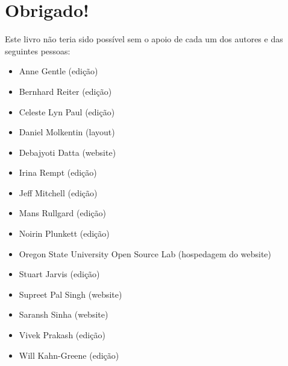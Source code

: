 \section*{Obrigado!}

Este livro não teria sido possível sem o apoio de cada um dos autores
e das seguintes pessoas:
\begin{itemize}
 \item Anne Gentle (edição)
 \item Bernhard Reiter (edição)
 \item Celeste Lyn Paul (edição)
 \item Daniel Molkentin (layout)
 \item Debajyoti Datta (website)
 \item Irina Rempt (edição)
 \item Jeff Mitchell (edição)
 \item Mans Rullgard (edição)
 \item Noirin Plunkett (edição)
 \item Oregon State University Open Source Lab (hospedagem do website)
 \item Stuart Jarvis (edição)
 \item Supreet Pal Singh (website)
 \item Saransh Sinha (website)
 \item Vivek Prakash (edição)
 \item Will Kahn-Greene (edição)
\end{itemize}

\newpage
